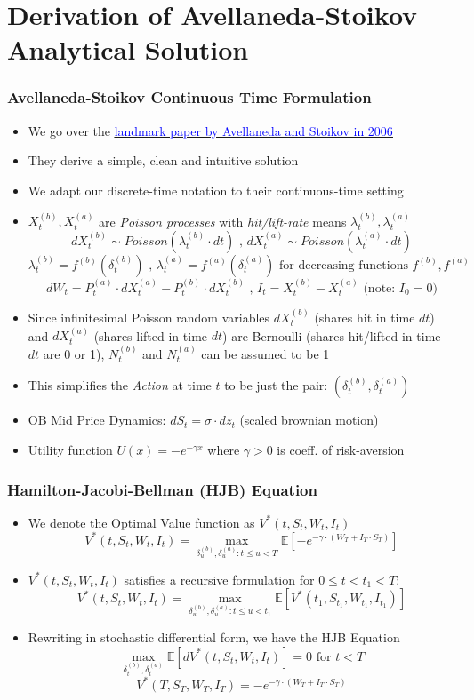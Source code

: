 \documentclass[handout]{beamer}
\begin{document}
\section{Derivation of Avellaneda-Stoikov Analytical Solution}
\begin{frame}
\frametitle{Avellaneda-Stoikov Continuous Time Formulation}
\pause
\begin{itemize}[<+->]
\item We go over the \href{https://www.math.nyu.edu/faculty/avellane/HighFrequencyTrading.pdf}{\underline{\textcolor{blue}{landmark paper by Avellaneda and Stoikov in 2006}}}
\item They derive a simple, clean and intuitive solution
\item We adapt our discrete-time notation to their continuous-time setting
\item $X_t^{(b)}, X_t^{(a)}$ are {\em Poisson processes} with {\em hit/lift-rate} means $\lambda_t^{(b)}, \lambda_t^{(a)}$
$$dX_t^{(b)} \sim Poisson(\lambda_t^{(b)} \cdot dt) \mbox{ , } dX_t^{(a)} \sim Poisson(\lambda_t^{(a)} \cdot dt)$$
$$\lambda_t^{(b)} = f^{(b)}(\delta_t^{(b)}) \mbox{ , } \lambda_t^{(a)} = f^{(a)}(\delta_t^{(a)}) \mbox{ for decreasing functions } f^{(b)}, f^{(a)}$$
$$dW_t = P_t^{(a)} \cdot dX_t^{(a)} - P_t^{(b)} \cdot dX_t^{(b)} \mbox{ , } I_t = X_t^{(b)} - X_t^{(a)} \mbox{ (note: } I_0 = 0 \mbox{)}$$
\item Since infinitesimal Poisson random variables $dX_t^{(b)}$ (shares hit in time $dt$) and $dX_t^{(a)}$ (shares lifted in time $dt$) are Bernoulli (shares hit/lifted in time $dt$ are 0 or 1), $N_t^{(b)}$ and $N_t^{(a)}$ can be assumed to be 1
\item This simplifies the {\em Action} at time $t$ to be just the pair: $(\delta_t^{(b)}, \delta_t^{(a)})$
\item OB Mid Price Dynamics: $dS_t = \sigma \cdot dz_t$ (scaled brownian motion)
\item Utility function $U(x) = -e^{-\gamma x}$ where $\gamma > 0$ is coeff. of risk-aversion  
\end{itemize}
\end{frame}

\begin{frame}
\frametitle{Hamilton-Jacobi-Bellman (HJB) Equation}
\pause
\begin{itemize}[<+->]
\item We denote the Optimal Value function as $V^*(t, S_t, W_t, I_t)$
$$V^*(t, S_t, W_t, I_t) = \max_{\delta_u^{(b)}, \delta_u^{(a)}: t \leq u < T} \mathbb{E}[-e^{-\gamma \cdot (W_T + I_T \cdot S_T)}]$$
\item $V^*(t, S_t, W_t, I_t)$ satisfies a recursive formulation for $0 \leq t < t_1 < T$:
$$V^*(t, S_t, W_t, I_t) = \max_{\delta_u^{(b)}, \delta_u^{(a)}: t \leq u < t_1} \mathbb{E}[V^*(t_1, S_{t_1}, W_{t_1}, I_{t_1})]$$
\item Rewriting in stochastic differential form, we have the HJB Equation
$$\max_{\delta_t^{(b)}, \delta_t^{(a)}} \mathbb{E}[dV^*(t, S_t, W_t, I_t)] = 0 \mbox{ for } t < T$$
$$V^*(T, S_T, W_T, I_T) = -e^{-\gamma \cdot (W_T + I_T \cdot S_T)}$$
\end{itemize}
\end{frame}
\end{document}
